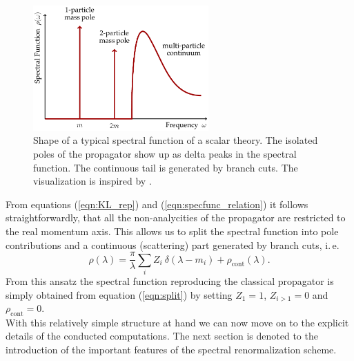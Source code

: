 \begin{figure}[t]
\centering
\includegraphics[width=0.6\textwidth]{figures/scalar_spec_func}
\caption{Shape of a typical spectral function of a scalar theory. The isolated poles of the propagator show up as delta peaks in the spectral function. The continuous tail is generated by branch cuts. The visualization is inspired by \cite{NPgaugeLecture}.}\label{fig:scalar_spec_func}
\end{figure}

\noindent 
From equations (\ref{eqn:KL_rep}) and (\ref{eqn:specfunc_relation}) it follows straightforwardly, that all the non-analycities of the propagator are restricted to the real momentum axis. This allows us to split the spectral function into pole contributions and a continuous (scattering) part generated by branch cuts, i.\,e.
\begin{equation}
	\rho(\lambda) = \frac{\pi}{\lambda}\sum\limits_{i} Z_i\ \delta(\lambda-m_i) + \rho_{\mathrm{cont}}(\lambda). \label{eqn:split}
\end{equation}
From this ansatz the spectral function reproducing the classical propagator is simply obtained from equation (\ref{eqn:split}) by setting $Z_1 = 1$, $Z_{i>1} = 0 $ and $\rho_{\mathrm{cont}}=0$.\\
With this relatively simple structure at hand we can now move on to the explicit details of the conducted computations. The next section is denoted to the introduction of the important features of the spectral renormalization scheme.







